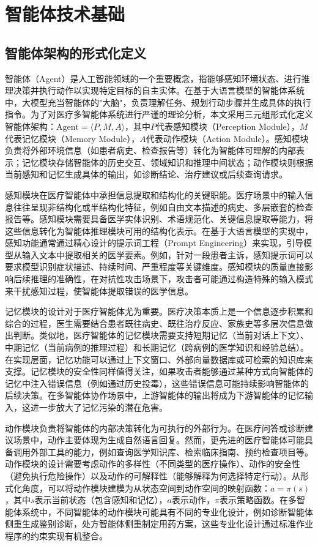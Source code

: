 \section{智能体技术基础}
\label{sec:agent_basis}

\subsection{智能体架构的形式化定义}
\label{subsec:agent_arch}

智能体（Agent）是人工智能领域的一个重要概念，指能够感知环境状态、进行推理决策并执行动作以实现特定目标的自主实体\cite{wang2023survey,xi2023agents}。在基于大语言模型的智能体系统中，大模型充当智能体的"大脑"，负责理解任务、规划行动步骤并生成具体的执行指令。为了对医疗多智能体系统进行严谨的理论分析，本文采用三元组形式化定义智能体架构：$\text{Agent} = \langle P, M, A \rangle$，其中$P$代表感知模块（Perception Module），$M$代表记忆模块（Memory Module），$A$代表动作模块（Action Module）。感知模块负责将外部环境信息（如患者病史、检查报告等）转化为智能体可理解的内部表示；记忆模块存储智能体的历史交互、领域知识和推理中间状态；动作模块则根据当前感知和记忆生成具体的输出，如诊断结论、治疗建议或后续查询请求。

感知模块在医疗智能体中承担信息提取和结构化的关键职能。医疗场景中的输入信息往往呈现非结构化或半结构化特征，例如自由文本描述的病史、多层嵌套的检查报告等。感知模块需要具备医学实体识别、术语规范化、关键信息提取等能力，将这些信息转化为智能体推理模块可用的结构化表示。在基于大语言模型的实现中，感知功能通常通过精心设计的提示词工程（Prompt Engineering）来实现，引导模型从输入文本中提取相关的医学要素。例如，针对一段患者主诉，感知提示词可以要求模型识别症状描述、持续时间、严重程度等关键维度。感知模块的质量直接影响后续推理的准确性，在对抗性攻击场景下，攻击者可能通过构造特殊的输入模式来干扰感知过程，使智能体提取错误的医学信息。

记忆模块的设计对于医疗智能体尤为重要。医疗决策本质上是一个信息逐步积累和综合的过程，医生需要结合患者既往病史、既往治疗反应、家族史等多层次信息做出判断。类似地，医疗智能体的记忆模块需要支持短期记忆（当前对话上下文）、中期记忆（当前病例的推理过程）和长期记忆（跨病例的医学知识和经验总结）。在实现层面，记忆功能可以通过上下文窗口、外部向量数据库或可检索的知识库来支撑。记忆模块的安全性同样值得关注，如果攻击者能够通过某种方式向智能体的记忆中注入错误信息（例如通过历史投毒），这些错误信息可能持续影响智能体的后续决策。在多智能体协作场景中，上游智能体的输出将成为下游智能体的记忆输入，这进一步放大了记忆污染的潜在危害。

动作模块负责将智能体的内部决策转化为可执行的外部行为。在医疗问答或诊断建议场景中，动作主要体现为生成自然语言回复。然而，更先进的医疗智能体可能具备调用外部工具的能力，例如查询医学知识库、检索临床指南、预约检查项目等。动作模块的设计需要考虑动作的多样性（不同类型的医疗操作）、动作的安全性（避免执行危险操作）以及动作的可解释性（能够解释为何选择特定行动）。从形式化角度，可以将动作模块建模为从状态空间到动作空间的映射函数：$a = \pi(s)$，其中$s$表示当前状态（包含感知和记忆），$a$表示动作，$\pi$表示策略函数。在多智能体系统中，不同智能体的动作模块可能具有不同的专业化设计，例如诊断智能体侧重生成鉴别诊断，处方智能体侧重制定用药方案，这些专业化设计通过标准作业程序的约束实现有机整合\cite{yao2022react,qian2023chatdev}。

